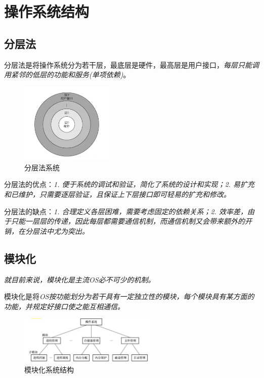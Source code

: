 \section{操作系统结构}

\subsection{分层法}

    分层法是将操作系统分为若干层，最底层是硬件，最高层是用户接口，\emph{\color{red}每层只能调用紧邻的低层的功能和服务(单项依赖)}。

\begin{figure}[!htbp]
    \centering
    \includegraphics[width=0.4\textwidth]{image/chapter01/分层法.png}
    \caption{分层法系统}
\end{figure}

    分层法的优点：\emph{1. 便于系统的调试和验证，简化了系统的设计和实现；2. 易扩充和已维护，只需要逐层验证，且保证上下层接口即可轻易的扩充和修改。}

    分层法的缺点：\emph{1. 合理定义各层困难，需要考虑固定的依赖关系；2. 效率差，由于只能一层层的传递，因此每层都需要通信机制，而通信机制又会带来额外的开销，在分层法中尤为突出。}

\subsection{模块化}

    \emph{就目前来说，模块化是主流OS必不可少的机制。}

    模块化是将\emph{OS按功能划分为若干具有一定独立性的模块，每个模块具有某方面的功能，并规定好接口使之能互相通信。}

\begin{figure}[!htbp]
    \centering
    \includegraphics[width=0.6\textwidth]{image/chapter01/模块化.png}
    \caption{模块化系统结构}
\end{figure}

